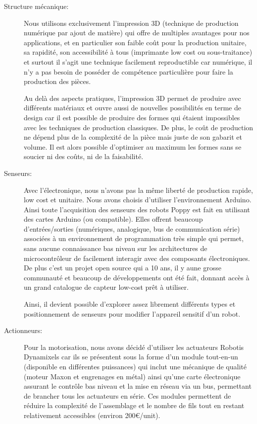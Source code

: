 \begin{description}
  \item[Structure mécanique:] Nous utilisons exclusivement l'impression 3D (technique de production numérique par ajout de matière) qui offre de multiples avantages pour nos applications, et en particulier son faible coût pour la production unitaire, sa rapidité, son accessibilité à tous (imprimante low cost ou sous-traitance) et surtout il s'agit une technique facilement reproductible car numérique, il n'y a pas besoin de posséder de compétence particulière pour faire la production des pièces. 

  Au delà des aspects pratiques, l'impression 3D permet de produire avec différents matériaux et ouvre aussi de nouvelles possibilités en terme de design car il est possible de produire des formes qui étaient impossibles avec les techniques de production classiques. De plus, le coût de production ne dépend plus de la complexité de la pièce mais juste de son gabarit et volume. 
  Il est alors possible d'optimiser au maximum les formes sans se soucier ni des coûts, ni de la faisabilité.

  \item[Senseurs:] Avec l'électronique, nous n'avons pas la même liberté de production rapide, low cost et unitaire. Nous avons choisis d'utiliser l'environnement Arduino. Ainsi toute l'acquisition des senseurs des robots Poppy est fait en utilisant des cartes Arduino (ou compatible). Elles offrent beaucoup d'entrées/sorties (numériques, analogique, bus de communication série) associées à un environnement de programmation très simple qui permet, sans aucune connaissance bas niveau sur les architectures de microcontrôleur de facilement interagir avec des composants électroniques.
  De plus c'est un projet open source qui a 10 ans, il y aune grosse communauté et beaucoup de développements ont été fait, donnant accès à un grand catalogue de capteur low-cost prêt à utiliser.

  Ainsi, il devient possible d'explorer assez librement différents types et positionnement de senseurs pour modifier l'appareil sensitif d'un robot.

  \item[Actionneurs:] Pour la motorisation, nous avons décidé d'utiliser les actuateurs Robotis Dynamixels car ils se présentent sous la forme d'un module tout-en-un (disponible en différentes puissances) qui inclut une mécanique de qualité (moteur Maxon et engrenages en métal) ainsi qu'une carte électronique assurant le contrôle bas niveau et la mise en réseau via un bus, permettant de brancher tous les actuateurs en série. Ces modules permettent de réduire la complexité de l'assemblage et le nombre de fils tout en restant relativement accessibles (environ 200€/unit).


\end{description}
